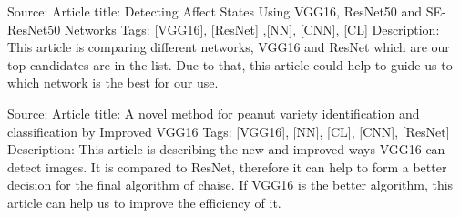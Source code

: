 Source: \parencite{theckedath2020detecting}
\newline
Article title: Detecting Affect States Using VGG16, ResNet50 and SE-ResNet50 
\newline
Networks Tags: [VGG16], [ResNet] ,[NN], [CNN], [CL]
\newline
Description:
\newline
This article is comparing different networks, VGG16 and ResNet which are our top candidates are in the list. Due to that, this article could help to guide us to which network is the best for our use.
\newline

Source: \parencite{yang2021novel}
\newline
Article title: A novel method for peanut variety identification and classification by Improved VGG16
\newline
Tags: [VGG16], [NN], [CL], [CNN], [ResNet]
\newline
Description:
\newline
This article is describing the new and improved ways VGG16 can detect images. It is compared to ResNet, therefore it can help to form a better decision for the final algorithm of chaise. If VGG16 is the better algorithm, this article can help us to improve the efficiency of it.